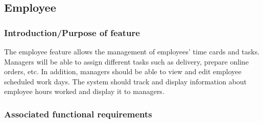 \documentclass{scrreprt}
\theoremstyle{funreq}
\begin{document}
	\subsection{Employee}
	\subsubsection{Introduction/Purpose of feature}
	The employee feature allows the management of employees’ time cards and tasks. Managers will be able to assign different tasks such as delivery, prepare online orders, etc.  In addition, managers should be able to view and edit employee scheduled work days.  The system should track and display information about employee hours worked and display it to managers.
	
%	
%	
	\subsubsection{Associated functional requirements}
\end{document}

